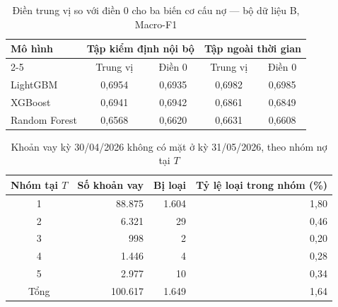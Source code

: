 \begin{table}[H]
\centering
\caption{Điền trung vị so với điền 0 cho ba biến cơ cấu nợ --- bộ dữ liệu B, Macro-F1}
\label{tab:restructure-impute}
\begin{tabular}{|l|c|c||c|c|}
\hline
\multirow{2}{*}{Mô hình} & \multicolumn{2}{c||}{Tập kiểm định nội bộ} & \multicolumn{2}{c|}{Tập ngoài thời gian}\\
\cline{2-5}
 & Trung vị & Điền 0 & Trung vị & Điền 0\\
\hline
LightGBM & 0,6954 & 0,6935 & 0,6982 & 0,6985\\
XGBoost & 0,6941 & 0,6942 & 0,6861 & 0,6849\\
Random Forest & 0,6568 & 0,6620 & 0,6631 & 0,6608\\
\hline
\end{tabular}
\end{table}

\begin{table}[H]
\centering
\caption{Khoản vay kỳ 30/04/2026 không có mặt ở kỳ 31/05/2026, theo nhóm nợ tại $T$}
\label{tab:transition-exclusion}
\begin{tabular}{|c|r|r|r|}
\hline
Nhóm tại $T$ & Số khoản vay & Bị loại & Tỷ lệ loại trong nhóm (\%)\\
\hline
1 & 88.875 & 1.604 & 1,80\\
2 & 6.321 & 29 & 0,46\\
3 & 998 & 2 & 0,20\\
4 & 1.446 & 4 & 0,28\\
5 & 2.977 & 10 & 0,34\\
\hline
Tổng & 100.617 & 1.649 & 1,64\\
\hline
\end{tabular}
\end{table}
